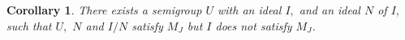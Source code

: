 \documentclass[twoside,a4paper,12pt,reqno]{amsart}
\theoremstyle{plain}
\newtheorem{cor}[thm]{Corollary}
\theoremstyle{definition}
\newtheorem{ex}[thm]{Example}
\newtheorem{rem}[thm]{Remark}
\renewcommand{\j}{\mbox{${\mathcal{J}}$}}
\newcommand{\leql}{\leq_{\mathcal{L}}}
\newcommand{\leqj}{\leq_{\mathcal{J}}}
\newcommand{\ol}{\overline}
\begin{document}
\begin{cor}\label{cor:ideal}
There exists a semigroup $U$ with an ideal $I,$ and an ideal $N$ of $I,$ such that $U,$ $N$ and $I/N$ satisfy $M_J$ but $I$ does not satisfy $M_J$.
\end{cor}


%
%

\end{document}
